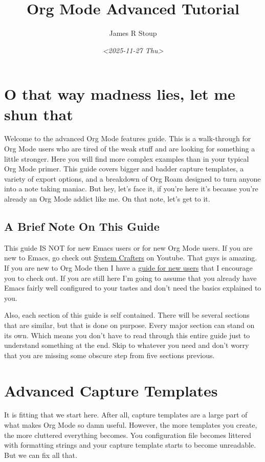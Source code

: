 \documentclass[11pt]{article}
\author{James R Stoup}
\date{\textit{<2025-11-27 Thu>}}
\title{Org Mode Advanced Tutorial}
\begin{document}
\maketitle
\tableofcontents

\section*{O that way madness lies, let me shun that}
\label{sec:orgc9185f6}
Welcome to the advanced Org Mode features guide. This is a walk-through for Org Mode users who are tired of the weak stuff and are looking for something a little stronger. Here you will find more complex examples than in your typical Org Mode primer. This guide covers bigger and badder capture templates, a variety of export options, and a breakdown of Org Roam designed to turn anyone into a note taking maniac. But hey, let's face it, if you're here it's because you're already an Org Mode addict like me. On that note, let's get to it.
\subsection*{A Brief Note On This Guide}
\label{sec:orged74410}
This guide IS NOT for new Emacs users or for new Org Mode users. If you are new to Emacs, go check out \href{https://www.youtube.com/c/SystemCrafters}{System Crafters} on Youtube. That guys is amazing. If you are new to Org Mode then I have a \href{https://github.com/james-stoup/emacs-org-mode-tutorial}{guide for new users} that I encourage you to check out. If you are still here I'm going to assume that you already have Emacs fairly well configured to your tastes and don't need the basics explained to you.

Also, each section of this guide is self contained. There will be several sections that are similar, but that is done on purpose. Every major section can stand on its own. Which means you don't have to read through this entire guide just to understand something at the end. Skip to whatever you need and don't worry that you are missing some obscure step from five sections previous.
\section*{Advanced Capture Templates}
\label{sec:org118b065}
It is fitting that we start here. After all, capture templates are a large part of what makes Org Mode so damn useful. However, the more templates you create, the more cluttered everything becomes. You configuration file becomes littered with formatting strings and your capture template starts to become unreadable. But we can fix all that.
\end{document}
